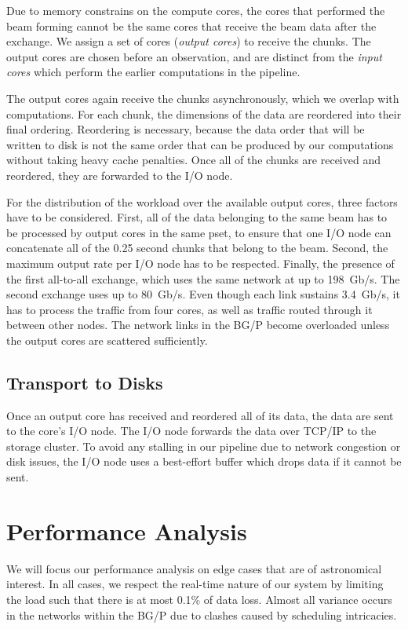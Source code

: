 \documentclass{llncs}
\begin{document}
Due to memory constrains on the compute cores, the cores that performed the beam forming cannot be the same cores that receive the beam data after the exchange. We assign a set of cores (\emph{output cores}) to receive the chunks. The output cores are chosen before an observation, and are distinct from the \emph{input cores} which perform the earlier computations in the pipeline.

The output cores again receive the chunks asynchronously, which we overlap with computations. For each chunk, the dimensions of the data are reordered into their final ordering. Reordering is necessary, because the data order that will be written to disk is not the same order that can be produced by our computations without taking heavy cache penalties. Once all of the chunks are received and reordered, they are forwarded to the I/O node.

For the distribution of the workload over the available output cores, three factors have to be considered. First, all of the data belonging to the same beam has to be processed by output cores in the same pset, to ensure that one I/O node can concatenate all of the 0.25 second chunks that belong to the beam. Second, the maximum output rate per I/O node has to be respected. Finally, the presence of the first all-to-all exchange, which uses the same network at up to 198~Gb/s. The second exchange uses up to 80~Gb/s. Even though each link sustains 3.4~Gb/s, it has to process the traffic from four cores, as well as traffic routed through it between other nodes. The network links in the BG/P become overloaded unless the output cores are scattered sufficiently.

\subsection{Transport to Disks}
Once an output core has received and reordered all of its data, the data are sent to the core's I/O node. The I/O node forwards the data over TCP/IP to the storage cluster. To avoid any stalling in our pipeline due to network congestion or disk issues, the I/O node uses a best-effort buffer which drops data if it cannot be sent.

\section{Performance Analysis}
\label{Sec:performance}

We will focus our performance analysis on edge cases that are of astronomical interest. In all cases, we respect the real-time nature of our system by limiting the load such that there is at most 0.1\% of data loss. Almost all variance occurs in the networks within the BG/P due to clashes caused by scheduling intricacies.
\end{document}
